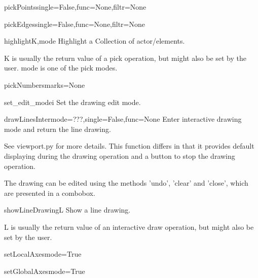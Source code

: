 \begin{funcdesc}{pickPoints}{single=False,func=None,filtr=None}


\end{funcdesc}


\begin{funcdesc}{pickEdges}{single=False,func=None,filtr=None}


\end{funcdesc}


\begin{funcdesc}{highlight}{K,mode}
Highlight a Collection of actor/elements.

    K is usually the return value of a pick operation, but might also
    be set by the user.
    mode is one of the pick modes.
    

\end{funcdesc}


\begin{funcdesc}{pickNumbers}{marks=None}


\end{funcdesc}


\begin{funcdesc}{set_edit_mode}{i}
Set the drawing edit mode.

\end{funcdesc}


\begin{funcdesc}{drawLinesInter}{mode=???,single=False,func=None}
Enter interactive drawing mode and return the line drawing.

    See viewport.py for more details.
    This function differs in that it provides default displaying
    during the drawing operation and a button to stop the drawing operation.

    The drawing can be edited using the methods 'undo', 'clear' and 'close', which
    are presented in a combobox.
    

\end{funcdesc}


\begin{funcdesc}{showLineDrawing}{L}
Show a line drawing.

    L is usually the return value of an interactive draw operation, but
    might also be set by the user.
    

\end{funcdesc}


\begin{funcdesc}{setLocalAxes}{mode=True}


\end{funcdesc}


\begin{funcdesc}{setGlobalAxes}{mode=True}


\end{funcdesc}



